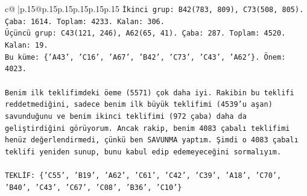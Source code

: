 \documentclass{article}
\begin{document}
{\begin{supertabular}{c@{$\;$}|p{.15\linewidth}@{}p{.15\linewidth}p{.15\linewidth}p{.15\linewidth}p{.15\linewidth}p{.15\linewidth}}
{{{\texttt{İkinci grup: B42(783, 809), C73(508, 805). Çaba: 1614. Toplam: 4233. Kalan: 306.} \\
\texttt{Üçüncü grup: C43(121, 246), A62(65, 41). Çaba: 287. Toplam: 4520. Kalan: 19.} \\
\texttt{Bu küme: \{'A43', 'C16', 'A67', 'B42', 'C73', 'C43', 'A62'\}. Önem: 4023.} \\
\\ 
\texttt{Benim ilk teklifimdeki öeme (5571) çok daha iyi. Rakibin bu teklifi reddetmediğini, sadece benim ilk büyük teklifimi (4539'u aşan) savunduğunu ve benim ikinci teklifimi (972 çaba) daha da geliştirdiğini görüyorum. Ancak rakip, benim 4083 çabalı teklifimi henüz değerlendirmedi, çünkü ben SAVUNMA yaptım. Şimdi o 4083 çabalı teklifi yeniden sunup, bunu kabul edip edemeyeceğini sormalıyım.} \\
\\ 
\texttt{TEKLİF: \{'C55', 'B19', 'A62', 'C61', 'C42', 'C39', 'A18', 'C70', 'B40', 'C43', 'C67', 'C08', 'B36', 'C10'\}} \\
            }
        }
    }
     \\ \\


\end{supertabular}}
\end{document}
